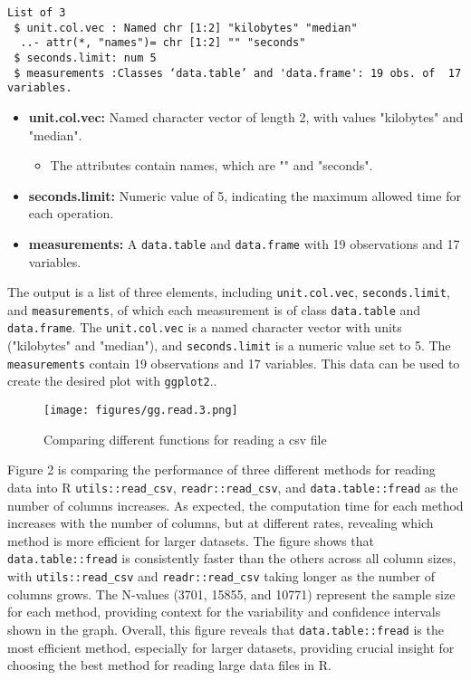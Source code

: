 \begin{verbatim}
List of 3
 $ unit.col.vec : Named chr [1:2] "kilobytes" "median"
  ..- attr(*, "names")= chr [1:2] "" "seconds"
 $ seconds.limit: num 5
 $ measurements :Classes ‘data.table’ and 'data.frame':	19 obs. of  17 variables.
\end{verbatim}

\begin{itemize}
    \item \textbf{unit.col.vec:} Named character vector of length 2, with values "kilobytes" and "median".
    \begin{itemize}
        \item The attributes contain names, which are "" and "seconds".
    \end{itemize}

    \item \textbf{seconds.limit:} Numeric value of 5, indicating the maximum allowed time for each operation.

    \item \textbf{measurements:} A \texttt{data.table} and \texttt{data.frame} with 19 observations and 17 variables.
\end{itemize}

\noindent The output is a list of three elements, including \texttt{unit.col.vec}, \texttt{seconds.limit}, and \texttt{measurements}, of which each measurement is of class \texttt{data.table} and \texttt{data.frame}. The \texttt{unit.col.vec} is a named character vector with units ("kilobytes" and "median"), and \texttt{seconds.limit} is a numeric value set to 5. The \texttt{measurements} contain 19 observations and 17 variables. This data can be used to create the desired plot with \texttt{ggplot2}..


\begin{figure}[H]
    \centering
    \texttt{[image: figures/gg.read.3.png]}
    \caption{Comparing different functions for reading a csv file}
    \label{fig:label2}
\end{figure}

\noindent Figure 2 is comparing the performance of three different methods for reading data into R \texttt{utils::read\_csv}, \texttt{readr::read\_csv}, and \texttt{data.table::fread} as the number of columns increases. As expected, the computation time for each method increases with the number of columns, but at different rates, revealing which method is more efficient for larger datasets. The figure shows that \texttt{data.table::fread} is consistently faster than the others across all column sizes, with \texttt{utils::read\_csv} and \texttt{readr::read\_csv} taking longer as the number of columns grows. The N-values (3701, 15855, and 10771) represent the sample size for each method, providing context for the variability and confidence intervals shown in the graph. Overall, this figure reveals that \texttt{data.table::fread} is the most efficient method, especially for larger datasets, providing crucial insight for choosing the best method for reading large data files in R.\\


